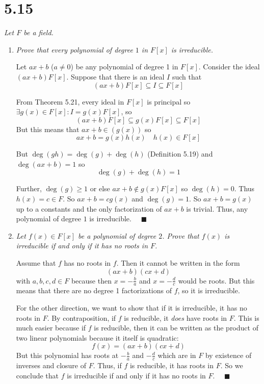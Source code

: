\documentclass[12pt]{article}
\newcommand{\qed}{\quad \blacksquare}
\begin{document}
\section*{5.15}
    \emph{Let $F$ be a field.}
    \begin{enumerate}[label=(\alph*)]
        \item \emph{Prove that every polynomial of degree $1$ in $F[x]$ is irreducible.}
        
            \color{blue}
                Let $ax + b$ ($a \neq 0$) be any polynomial of degree 1 in $F[x]$. Consider the ideal $(ax + b)F[x]$. Suppose that there is an ideal $I$ such that 
                \[(ax + b)F[x] \subseteq I \subseteq F[x]\]

                From Theorem 5.21, every ideal in $F[x]$ is principal so $\exists g(x)\in F[x]: I = g(x)F[x]$, so
                \[(ax + b)F[x] \subseteq g(x)F[x] \subseteq F[x]\]
                But this means that $ax + b \in (g(x))$ so 
                \[ax + b = g(x)h(x) \quad h(x) \in F[x]\]

                But $\deg(gh) = \deg(g) + \deg(h)$ (Definition 5.19) and $\deg(ax + b) = 1$ so 
                \[\deg(g) + \deg(h) = 1\] 
                
                Further, $\deg(g) \geq 1$ or else $ax + b \not \in g(x)F[x]$ so $\deg(h) = 0$. Thus $h(x) = c \in F$. So $ax + b = cg(x)$ and $\deg(g) = 1$. So $ax + b = g(x)$ up to a constants and the only factorization of $ax + b$ is trivial. Thus, any polynomial of degree $1$ is irreducible. $\qed$

            \color{black}

        \item \emph{Let $f(x) \in F[x]$ be a polynomial of degree $2$. Prove that $f(x)$ is irreducible if and only if it has no roots in $F$.}
        
            \color{blue}
                Assume that $f$ has no roots in $f$. Then it cannot be written in the form 
                \[(ax + b)(cx + d)\]
                with $a, b, c, d \in F$ because then $x = -\frac{b}{a}$ and $x =- \frac{d}{c}$ would be roots. But this means that there are no degree 1 factorizations of $f$, so it is irreducible. 

                For the other direction, we want to show that if it is irreducible, it has no roots in $F$. By contraposition, if $f$ is reducible, it \emph{does} have roots in $F$. This is much easier because if $f$ is reducible, then it can be written as the product of two linear polynomials because it itself is quadratic:
                \[f(x) = (ax + b)(cx + d)\]
                But this polynomial has roots at $-\frac{b}{a}$ and $-\frac{d}{c}$ which are in $F$ by existence of inverses and closure of $F$. Thus, if $f$ is reducible, it has roots in $F$. So we conclude that $f$ is irreducible if and only if it has no roots in $F$. $\qed$
                

\end{enumerate}
\end{document}
